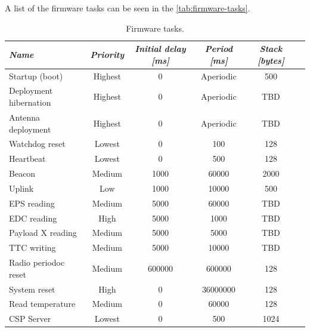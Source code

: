 A list of the firmware tasks can be seen in the \autoref{tab:firmware-tasks}.

\begin{table}[!h]
    \centering
    \begin{tabular}{lccccc}
        \toprule[1.5pt]
        \textit{Name}          & \textit{Priority} & \textit{Initial delay [ms]} & \textit{Period [ms]} & \textit{Stack [bytes]} \\
        \midrule
        Startup (boot)         & Highest           & 0                           & Aperiodic            & 500                    \\
        Deployment hibernation & Highest           & 0                           & Aperiodic            & TBD                    \\
        Antenna deployment     & Highest           & 0                           & Aperiodic            & TBD                    \\
        Watchdog reset         & Lowest            & 0                           & 100                  & 128                    \\
        Heartbeat              & Lowest            & 0                           & 500                  & 128                    \\
        Beacon                 & Medium            & 1000                        & 60000                & 2000                   \\
        Uplink                 & Low               & 1000                        & 10000                & 500                    \\
        EPS reading            & Medium            & 5000                        & 60000                & TBD                    \\
        EDC reading            & High              & 5000                        & 1000                 & TBD                    \\
        Payload X reading      & Medium            & 5000                        & 5000                 & TBD                    \\
        TTC writing            & Medium            & 5000                        & 10000                & TBD                    \\
        Radio periodoc reset   & Medium            & 600000                      & 600000               & 128                    \\
        System reset           & High              & 0                           & 36000000             & 128                    \\
        Read temperature       & Medium            & 0                           & 60000                & 128                    \\
        CSP Server             & Lowest            & 0                           & 500                  & 1024                   \\
        \bottomrule[1.5pt]
    \end{tabular}
    \caption{Firmware tasks.}
    \label{tab:firmware-tasks}
\end{table}

